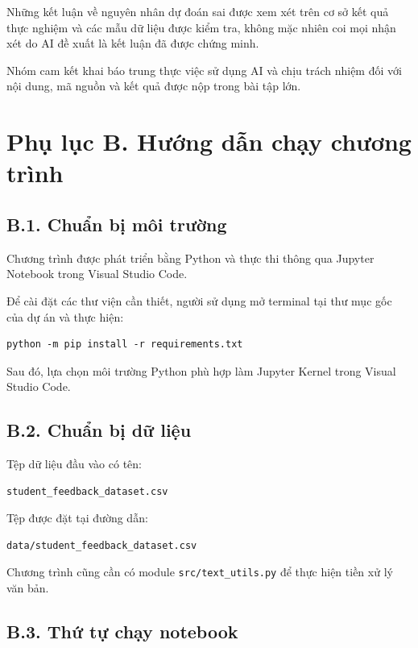 Những kết luận về nguyên nhân dự đoán sai
được xem xét trên cơ sở kết quả thực nghiệm
và các mẫu dữ liệu được kiểm tra,
không mặc nhiên coi mọi nhận xét do
AI đề xuất là kết luận đã được chứng minh.

Nhóm cam kết khai báo trung thực việc
sử dụng AI và chịu trách nhiệm đối với
nội dung, mã nguồn và kết quả
được nộp trong bài tập lớn.



\section*{Phụ lục B. Hướng dẫn chạy chương trình}

\subsection*{B.1. Chuẩn bị môi trường}

Chương trình được phát triển bằng Python
và thực thi thông qua Jupyter Notebook
trong Visual Studio Code.

Để cài đặt các thư viện cần thiết,
người sử dụng mở terminal tại thư mục
gốc của dự án và thực hiện:

\begin{verbatim}
python -m pip install -r requirements.txt
\end{verbatim}

Sau đó, lựa chọn môi trường Python
phù hợp làm Jupyter Kernel trong
Visual Studio Code.

\subsection*{B.2. Chuẩn bị dữ liệu}

Tệp dữ liệu đầu vào có tên:

\begin{verbatim}
student_feedback_dataset.csv
\end{verbatim}

Tệp được đặt tại đường dẫn:

\begin{verbatim}
data/student_feedback_dataset.csv
\end{verbatim}

Chương trình cũng cần có module
\texttt{src/text\_utils.py}
để thực hiện tiền xử lý văn bản.

\subsection*{B.3. Thứ tự chạy notebook}

